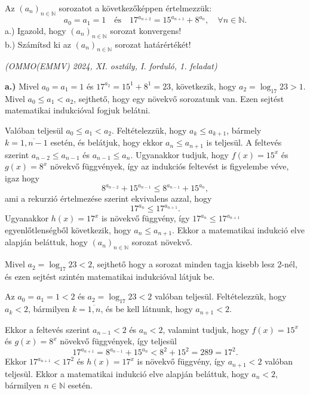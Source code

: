 \begin{extraproblem}
Az $(a_{n})_{n\in\mathbb{N}}$ sorozatot a következőképpen értelmezzük:
\[
a_{0}=a_{1}=1\quad\text{és}\quad17^{a_{n+2}}=15^{a_{n+1}}+8^{a_{n}},\quad\forall n\in\mathbb{N}.
\]
a.) Igazold, hogy $(a_{n})_{n\in\mathbb{N}}$ sorozat konvergens!\\
 b.) Számítsd ki az $(a_{n})_{n\in\mathbb{N}}$ sorozat határértékét!
\begin{flushright}
\textit{ (OMMO(EMMV) 2024, XI. osztály, I. forduló, 1. feladat)} 
\par\end{flushright}
\end{extraproblem}

\begin{solution}
\textbf{a.)} Mivel $a_{0}=a_{1}=1$ és $17^{a_{2}}=15^{1}+8^{1}=23$,
következik, hogy $a_{2}=\log_{17}23>1$. Mivel $a_{0}\leq a_{1}<a_{2}$,
sejthető, hogy egy növekvő sorozatunk van. Ezen sejtést matematikai
indukcióval fogjuk belátni.

Valóban teljesül $a_{0}\leq a_{1}<a_{2}$. Feltételezzük, hogy $a_{k}\leq a_{k+1}$,
bármely $k=\overline{1,n-1}$ esetén, és belátjuk, hogy ekkor $a_{n}\leq a_{n+1}$
is teljesül. A feltevés szerint $a_{n-2}\leq a_{n-1}$ és $a_{n-1}\leq a_{n}$.
Ugyanakkor tudjuk, hogy $f(x)=15^{x}$ és $g(x)=8^{x}$ növekvő függvények,
így az indukciós feltevést is figyelembe véve, igaz hogy 
\[
8^{a_{n-2}}+15^{a_{n-1}}\leq8^{a_{n-1}}+15^{a_{n}},
\]
ami a rekurzió értelmezése szerint ekvivalens azzal, hogy 
\[
17^{a_{n}}\leq17^{a_{n+1}}.
\]
Ugyanakkor $h(x)=17^{x}$ is növekvő függvény, így $17^{a_{n}}\leq17^{a_{n+1}}$
egyenlőtlenségből következik, hogy $a_{n}\leq a_{n+1}$. Ekkor a matematikai
indukció elve alapján beláttuk, hogy $(a_{n})_{n\in\mathbb{N}}$ sorozat
növekvő.

Mivel $a_{2}=\log_{17}23<2$, sejthető hogy a sorozat minden tagja
kisebb lesz 2-nél, és ezen sejtést szintén matematikai indukcióval
látjuk be.

Az $a_{0}=a_{1}=1<2$ és $a_{2}=\log_{17}23<2$ valóban teljesül.
Feltételezzük, hogy $a_{k}<2$, bármilyen $k=\overline{1,n}$, és
be kell látnunk, hogy $a_{n+1}<2$.

Ekkor a feltevés szerint $a_{n-1}<2$ és $a_{n}<2$, valamint tudjuk,
hogy $f(x)=15^{x}$ és $g(x)=8^{x}$ növekvő függvények, így teljesül
\[
17^{a_{n+1}}=8^{a_{n-1}}+15^{a_{n}}<8^{2}+15^{2}=289=17^{2}.
\]
Ekkor $17^{a_{n+1}}<17^{2}$ és $h(x)=17^{x}$ is növekvő függvény,
így $a_{n+1}<2$ valóban teljesül. Ekkor a matematikai indukció elve
alapján beláttuk, hogy $a_{n}<2$, bármilyen $n\in\mathbb{N}$ esetén.


\end{solution}
